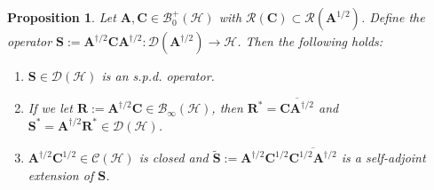 \documentclass[noinfoline]{imsart}\setcounter{tocdepth}{2}
\newcommand{\m}[1]{\mathbf{#1}} %
\renewcommand{\c}[1]{\mathcal{#1}} %
\newcommand{\innpr}[2]{{\left\langle {#1},{#2}\right\rangle}} %
\theoremstyle{plain}
\newtheorem{proposition}[theorem]{Proposition}
\newtheorem{example}{Example}[section]
\begin{document}


\begin{proposition}\label{cor:worowicz:self:adj}
Let $\m{A}, \m{C} \in \c{B}_{0}^{+}(\c{H})$ with $\c{R}(\m{C}) \subset \c{R}(\m{A}^{1/2})$. Define the operator $\m{S} := \m{A}^{\dagger/2} \m{C} \m{A}^{\dagger/2}: \c{D}(\m{A}^{\dagger/2}) \rightarrow \c{H}$. Then the following holds:
\begin{enumerate}[leftmargin = *]
\item $\m{S} \in \c{D}(\c{H})$ is an s.p.d. operator.
\item If we let $\m{R} := \m{A}^{\dagger/2} \m{C} \in \c{B}_{\infty}(\c{H})$, then $\m{R}^{*} = \overline{\m{C} \m{A}^{\dagger/2}}$ and $\m{S}^{*} = \m{A}^{\dagger/2} \m{R}^{*} \in \c{D}(\c{H})$.
\item $\m{A}^{\dagger/2} \m{C}^{1/2} \in \c{C}(\c{H})$ is closed and $\tilde{\m{S}} := \m{A}^{\dagger/2} \m{C}^{1/2} \overline{\m{C}^{1/2} \m{A}^{\dagger/2}}$ is a self-adjoint extension of $\m{S}$.
\end{enumerate}
\end{proposition}
\end{document}
